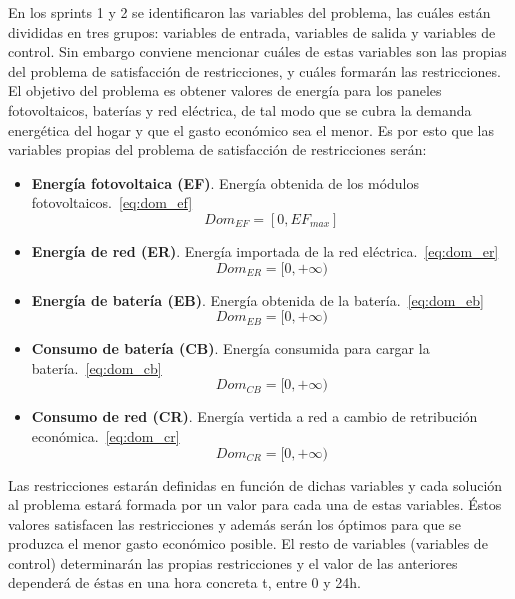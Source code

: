 En los sprints 1 y 2 se identificaron las variables del problema, las cuáles están divididas en tres grupos: variables de entrada, variables de salida y variables de control. Sin embargo conviene mencionar cuáles de estas variables son las propias del problema de satisfacción de restricciones, y cuáles formarán las restricciones. El objetivo del problema es obtener valores de energía para los paneles fotovoltaicos, baterías y red eléctrica, de tal modo que se cubra la demanda energética del hogar y que el gasto económico sea el menor. Es por esto que las variables propias del problema de satisfacción de restricciones serán:
\begin{itemize}
\item \textbf{Energía fotovoltaica (EF)}. Energía obtenida de los módulos fotovoltaicos.~\ref{eq:dom_ef}
\begin{equation}
        \label{eq:dom_ef}
        Dom_{EF} = [0, EF_{max}]
\end{equation}
\item \textbf{Energía de red (ER)}. Energía importada de la red eléctrica.~\ref{eq:dom_er}
\begin{equation}
        \label{eq:dom_er}
        Dom_{ER} = [0, +\infty)
\end{equation}
\item \textbf{Energía de batería (EB)}. Energía obtenida de la batería.~\ref{eq:dom_eb}
\begin{equation}
        \label{eq:dom_eb}
        Dom_{EB} = [0, +\infty)
\end{equation}
\item \textbf{Consumo de batería (CB)}. Energía consumida para cargar la batería.~\ref{eq:dom_cb}
\begin{equation}
        \label{eq:dom_cb}
        Dom_{CB} = [0, +\infty)
\end{equation}
\item \textbf{Consumo de red (CR)}. Energía vertida a red a cambio de retribución económica.~\ref{eq:dom_cr}
\begin{equation}
        \label{eq:dom_cr}
        Dom_{CR} = [0, +\infty)
\end{equation}
\end{itemize}

Las restricciones estarán definidas en función de dichas variables y cada solución al problema estará formada por un valor para cada una de estas variables. Éstos valores satisfacen las restricciones y además serán los óptimos para que se produzca el menor gasto económico posible. El resto de variables (variables de control) determinarán las propias restricciones y el valor de las anteriores dependerá de éstas en una hora concreta t, entre 0 y 24h.\\

